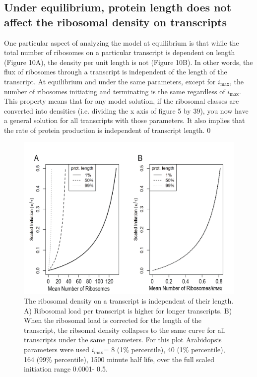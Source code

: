 \documentclass[review]{elsarticle}
\newcommand{\imax}{\ensuremath{i_{\max}}\xspace}
\begin{document}
\subsection{Under equilibrium, protein length does not affect the ribosomal density on transcripts}
One particular aspect of analyzing the model at equilibrium is that while the total number of ribosomes on a particular transcript is dependent on length (Figure 10A), the density per unit length is not (Figure 10B). In other words, the flux of ribosomes through a transcript is independent of the length of the transcript. At equilibrium and under the same parameters, except for \imax, the number of ribosomes initiating and terminating is the same regardless of \imax. This property means that for any model solution, if the ribosomal classes are converted into densities (i.e. dividing the x axis of figure 5 by 39), you now have a general solution for all transcripts with those parameters. It also implies that the rate of protein production is independent of transcript length. 0


\begin{figure}[!ht]
\centering
\includegraphics[width=120mm]{Images/2023-07-04_length_independence.png}
\caption{The ribosomal density on a transcript is independent of their length. A) Ribosomal load per transcript is higher for longer transcripts. B) When the ribosomal load is corrected for the length of the transcript, the ribsomal density collapses to the same curve for all transcripts under the same parameters. For this plot Arabidopsis parameters were used \imax =  8 (1\% percentile),  40 (1\% percentile), 164 (99\% percentile), 1500 minute half life, over the full scaled initiation range 0.0001- 0.5.}
\end{figure}
\clearpage
\end{document}
